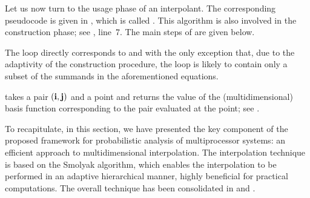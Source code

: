 
Let us now turn to the usage phase of an interpolant. The corresponding
pseudocode is given in , which is called . This
algorithm is also involved in the construction phase; see ,
line~7. The main steps of  are given below.

\begin{compactlist}

 The loop directly corresponds to  and
 with the only exception that, due to the adaptivity of
the construction procedure, the loop is likely to contain only a subset of the
summands in the aforementioned equations.

  takes a pair $(\mathbf{i}, \mathbf{j})$ and a point and
returns the value of the (multidimensional) basis function corresponding to the
pair evaluated at the point; see .

\end{compactlist}

To recapitulate, in this section, we have presented the key component of the
proposed framework for probabilistic analysis of multiprocessor systems: an
efficient approach to multidimensional interpolation. The interpolation
technique is based on the Smolyak algorithm, which enables the interpolation to
be performed in an adaptive hierarchical manner, highly beneficial for practical
computations. The overall technique has been consolidated in 
and .
